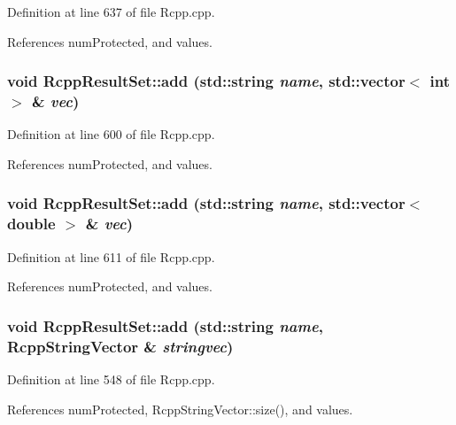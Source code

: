 Definition at line 637 of file Rcpp.cpp.

References numProtected, and values.\hypertarget{classRcppResultSet_23fa5be81281adcf3014749094816522}{
\subsubsection[{add}]{\setlength{\rightskip}{0pt plus 5cm}void RcppResultSet::add (std::string {\em name}, \/  std::vector$<$ int $>$ \& {\em vec})}}
\label{classRcppResultSet_23fa5be81281adcf3014749094816522}




Definition at line 600 of file Rcpp.cpp.

References numProtected, and values.\hypertarget{classRcppResultSet_2b4575ca5ccc390bc5437b1be4718ca6}{
\subsubsection[{add}]{\setlength{\rightskip}{0pt plus 5cm}void RcppResultSet::add (std::string {\em name}, \/  std::vector$<$ double $>$ \& {\em vec})}}
\label{classRcppResultSet_2b4575ca5ccc390bc5437b1be4718ca6}




Definition at line 611 of file Rcpp.cpp.

References numProtected, and values.\hypertarget{classRcppResultSet_10d01a24ef006c1ff14ca7e95fb9e0ea}{
\subsubsection[{add}]{\setlength{\rightskip}{0pt plus 5cm}void RcppResultSet::add (std::string {\em name}, \/  {\bf RcppStringVector} \& {\em stringvec})}}
\label{classRcppResultSet_10d01a24ef006c1ff14ca7e95fb9e0ea}




Definition at line 548 of file Rcpp.cpp.

References numProtected, RcppStringVector::size(), and values.

